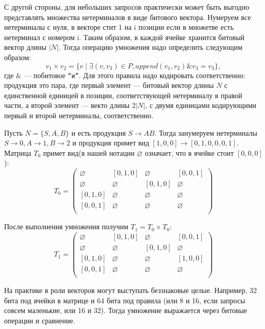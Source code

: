 С другой стороны, для небольших запросов практически может быть выгодно представлять множества нетерминалов в виде битового вектора.
Нумеруем все нетерминалы с нуля, в векторе стит 1 на i позиции если в множетве есть нетерминал с номером i.
Таким образом, в каждой ячейке хранится битовый вектор длины $|N|$.
Тогда операцию умножения надо определить следующим образом:
$$v_1 \times v_2 = \{v \mid \exists (v,v_3) \in P, \textit{append}(v_1, v_2) \& v_3 = v_3\},$$ где $\&$ --- побитовое \texttt{``и''}.
Для этого правила надо кодировать соответственно: продукция это пара, где первый элемент --- битовый вектор длины $N$ с единственной единицей в позиции, соответствующей нетерминалу в правой части, а второй элемент --- векто длины $2|N|$, с двумя единицами кодирующими первый и второй нетерминалы, соответственно.

\begin{example}
Пусть $N = \{S, A, B\}$ и есть продукция $S \to A B$. Тогда занумеруем нетерминалы $ S \to 0, A \to 1, B \to 2$ и продукция примет вид $[1, 0, 0] \to [0, 1, 0, 0, 0, 1]$. Матрица $T_0$ примет вид(в нашей нотации $\varnothing$ означает, что в ячейке стоит $[0,0,0]$):
\[
T_0 = \begin{pmatrix}
\varnothing & [0,1,0]       & \varnothing & [0,0,1]       \\
\varnothing & \varnothing & [0,1,0]       & \varnothing \\
[0,1,0]       & \varnothing & \varnothing & \varnothing \\
[0,0,1]      & \varnothing & \varnothing & \varnothing \\
\end{pmatrix}
\]

После выполнения умножения получим $T_1 = T_0 \times T_0$:
\[
T_1 = \begin{pmatrix}
\varnothing & [0,1,0]       & \varnothing & [0,0,1]       \\
\varnothing & \varnothing & [0,1,0]       & \varnothing \\
[0,1,0]       & \varnothing & \varnothing & [1,0,0] \\
[0,0,1]      & \varnothing & \varnothing & \varnothing \\
\end{pmatrix}
\]
\end{example}


На практике в роли векторов могут выступать беззнаковые целые. 
Например, 32 бита под ячейки в матрице и 64 бита под правила (или 8 и 16, если запросы совсем маленькие, или 16 и 32).
Тогда умножение выражается через битовые операции и сравнение.



